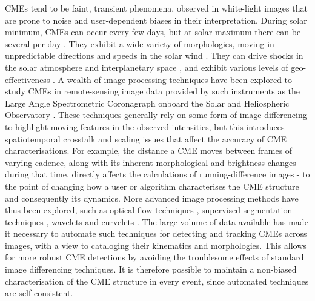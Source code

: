 \documentclass[referee,a4paper,12pt,traditabstract]{swsc}
\begin{document}
CMEs tend to be faint, transient phenomena, observed in white-light images that are prone to noise and user-dependent biases in their interpretation. During solar minimum, CMEs can occur every few days, but at solar maximum there can be several per day \citep{2000JGR...10518169S, 2004JGRA..10907105Y}. They exhibit a wide variety of morphologies, moving in unpredictable directions and speeds in the solar wind \citep{angeo-27-4491-2009, 2010NatCo...1E..74B, 2014NatCo...5E3481L}. They can drive shocks in the solar atmosphere and interplanetary space \citep{2005A&A...440..373H, 2013NatPh...9..811C}, and exhibit various levels of geo-effectiveness \citep{2001JASTP..63..389P, 2005AnGeo..23.1033S, 2009GeoRL..3608102D, 2013SoPh..285..281L}. A wealth of image processing techniques have been explored to study CMEs in remote-sensing image data provided by such instruments as the Large Angle Spectrometric Coronagraph \citep[LASCO;][]{1995SoPh..162..357B} onboard the Solar and Heliospheric Observatory \citep[SOHO;][]{1995SoPh..162....1D}. These techniques generally rely on some form of image differencing to highlight moving features in the observed intensities, but this introduces spatiotemporal crosstalk and scaling issues that affect the accuracy of CME characterisations. For example, the distance a CME moves between frames of varying cadence, along with its inherent morphological and brightness changes during that time, directly affects the calculations of running-difference images - to the point of changing how a user or algorithm characterises the CME structure and consequently its dynamics. More advanced image processing methods have thus been explored, such as optical flow techniques \citep{2006ApJ...652.1747C}, supervised segmentation techniques \citep{Goussies:2010:DTC:1749630.1750150}, wavelets \citep{2003A&A...398.1185S} and curvelets \citep{2011AdSpR..47.2118G}. The large volume of data available has made it necessary to automate such techniques for detecting and tracking CMEs across images, with a view to cataloging their kinematics and morphologies. This allows for more robust CME detections by avoiding the troublesome effects of standard image differencing techniques. It is therefore possible to maintain a non-biased characterisation of the CME structure in every event, since automated techniques are self-consistent.
\end{document}
